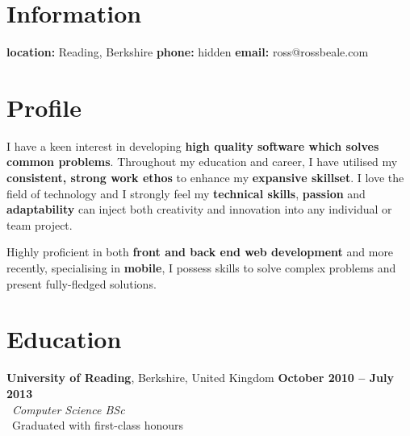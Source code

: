 \documentclass[margin,line,a4paper]{resume}
\begin{document}
\begin{resume}

	

	\section{\mysidestyle Information}

	\textbf{location:} Reading, Berkshire  
	\hfill 
	\textbf{phone:} hidden
	\hfill 
	\textbf{email:} ross@rossbeale.com

    	

	\section{\mysidestyle Profile}

	I have a keen interest in developing \textbf{high quality software which solves common problems}. Throughout my education and career, I have utilised my \textbf{consistent, strong work ethos} to enhance my \textbf{expansive skillset}.  I love the field of technology and I strongly feel my \textbf{technical skills}, \textbf{passion} and \textbf{adaptability} can inject both creativity and innovation into any individual or team project.  

Highly proficient in both \textbf{front and back end web development} and more recently, specialising in \textbf{mobile}, I possess skills to solve complex problems and present fully-fledged solutions.

	

	\section{\mysidestyle Education}

    	\textbf{University of Reading}, Berkshire, United Kingdom	\hfill		\textbf{ October 2010 -- July 2013} 
	\vspace{2mm}\\\
    	\textsl{Computer Science BSc}\
	\vspace{2mm}\\\
	Graduated with first-class honours
	\vspace{2mm}\


\end{resume}
\end{document}
